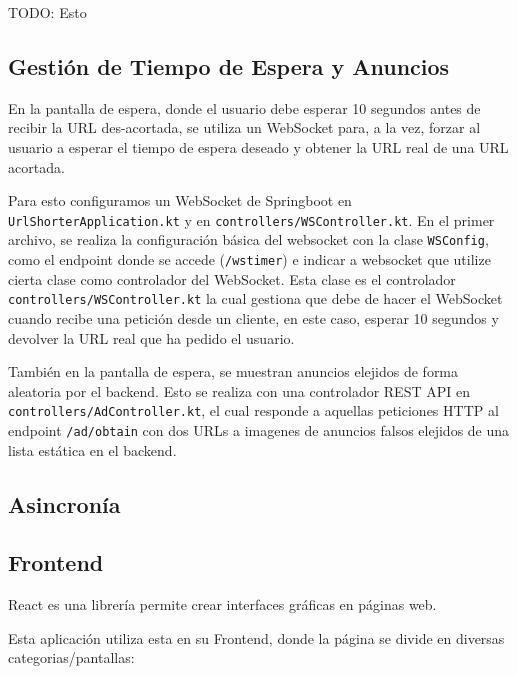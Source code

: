 \documentclass{article}
\begin{document}
TODO: Esto

\subsection{Gestión de Tiempo de Espera y Anuncios} \label{gestiontiempoespera}

En la pantalla de espera, donde el usuario debe esperar 10 segundos antes de recibir la URL des-acortada, se utiliza un WebSocket para, a la vez, forzar al usuario a esperar el tiempo
de espera deseado y obtener la URL real de una URL acortada.

Para esto configuramos un WebSocket de Springboot en \texttt{UrlShorterApplication.kt} y en \texttt{controllers/WSController.kt}. En el primer archivo, se realiza la configuración
básica del websocket con la clase \texttt{WSConfig}, como el endpoint donde se accede (\texttt{/wstimer}) e indicar a websocket que utilize cierta clase como controlador del WebSocket.
Esta clase es el controlador \texttt{controllers/WSController.kt} la cual gestiona que debe de hacer el WebSocket cuando recibe una petición desde un cliente, en este caso, esperar
10 segundos y devolver la URL real que ha pedido el usuario.

También en la pantalla de espera, se muestran anuncios elejidos de forma aleatoria por el backend. Esto se realiza con una controlador REST API en \texttt{controllers/AdController.kt},
el cual responde a aquellas peticiones HTTP al endpoint \texttt{/ad/obtain} con dos URLs a imagenes de anuncios falsos elejidos de una lista estática en el backend.

\subsection{Asincronía}

\subsection{Frontend}

React\cite{React} es una librería permite crear interfaces gráficas en páginas web.

Esta aplicación utiliza esta en su Frontend, donde la página se divide en diversas categorias/pantallas:
\end{document}
